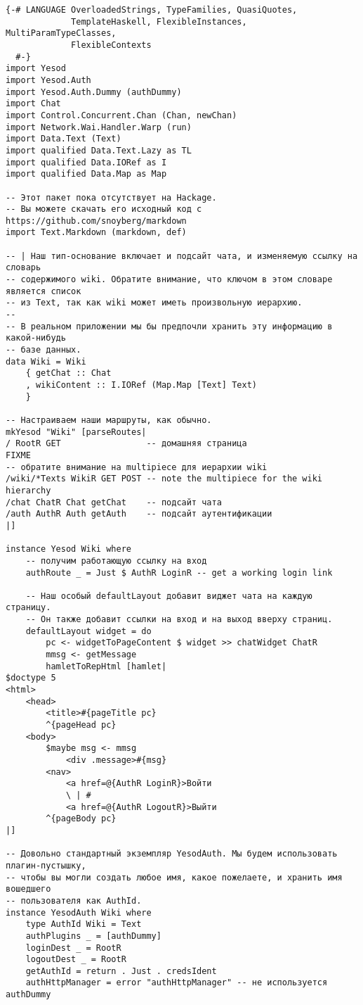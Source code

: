 \begin{lstlisting}
{-# LANGUAGE OverloadedStrings, TypeFamilies, QuasiQuotes,
             TemplateHaskell, FlexibleInstances, MultiParamTypeClasses,
             FlexibleContexts
  #-}
import Yesod
import Yesod.Auth
import Yesod.Auth.Dummy (authDummy)
import Chat
import Control.Concurrent.Chan (Chan, newChan)
import Network.Wai.Handler.Warp (run)
import Data.Text (Text)
import qualified Data.Text.Lazy as TL
import qualified Data.IORef as I
import qualified Data.Map as Map

-- Этот пакет пока отсутствует на Hackage.
-- Вы можете скачать его исходный код с https://github.com/snoyberg/markdown
import Text.Markdown (markdown, def)

-- | Наш тип-основание включает и подсайт чата, и изменяемую ссылку на словарь
-- содержимого wiki. Обратите внимание, что ключом в этом словаре является список
-- из Text, так как wiki может иметь произвольную иерархию.
--
-- В реальном приложении мы бы предпочли хранить эту информацию в какой-нибудь
-- базе данных.
data Wiki = Wiki
    { getChat :: Chat
    , wikiContent :: I.IORef (Map.Map [Text] Text)
    }

-- Настраиваем наши маршруты, как обычно.
mkYesod "Wiki" [parseRoutes|
/ RootR GET                 -- домашняя страница
FIXME
-- обратите внимание на multipiece для иерархии wiki
/wiki/*Texts WikiR GET POST -- note the multipiece for the wiki hierarchy
/chat ChatR Chat getChat    -- подсайт чата
/auth AuthR Auth getAuth    -- подсайт аутентификации
|]

instance Yesod Wiki where
    -- получим работающую ссылку на вход
    authRoute _ = Just $ AuthR LoginR -- get a working login link

    -- Наш особый defaultLayout добавит виджет чата на каждую страницу.
    -- Он также добавит ссылки на вход и на выход вверху страниц.
    defaultLayout widget = do
        pc <- widgetToPageContent $ widget >> chatWidget ChatR
        mmsg <- getMessage
        hamletToRepHtml [hamlet|
$doctype 5
<html>
    <head>
        <title>#{pageTitle pc}
        ^{pageHead pc}
    <body>
        $maybe msg <- mmsg
            <div .message>#{msg}
        <nav>
            <a href=@{AuthR LoginR}>Войти
            \ | #
            <a href=@{AuthR LogoutR}>Выйти
        ^{pageBody pc}
|]

-- Довольно стандартный экземпляр YesodAuth. Мы будем использовать плагин-пустышку,
-- чтобы вы могли создать любое имя, какое пожелаете, и хранить имя вошедшего
-- пользователя как AuthId.
instance YesodAuth Wiki where
    type AuthId Wiki = Text
    authPlugins _ = [authDummy]
    loginDest _ = RootR
    logoutDest _ = RootR
    getAuthId = return . Just . credsIdent
    authHttpManager = error "authHttpManager" -- не используется authDummy


\end{lstlisting}
